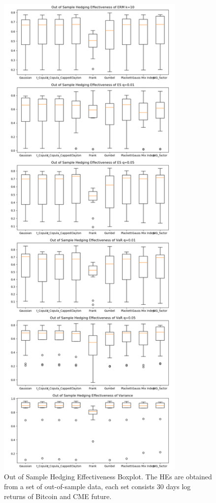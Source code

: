 \begin{figure}[!th]
   \centering
   \includegraphics[height=25cm]{_pics/Out of Sample Hedging Effectiveness.png}
   \caption{Out of Sample Hedging Effectiveness Boxplot.
   The HEs are obtained from a set of out-of-sample data,
   each set consists 30 days log returns of Bitcoin and CME future.
   }
   \label{fig:OOSHE}
\end{figure}

